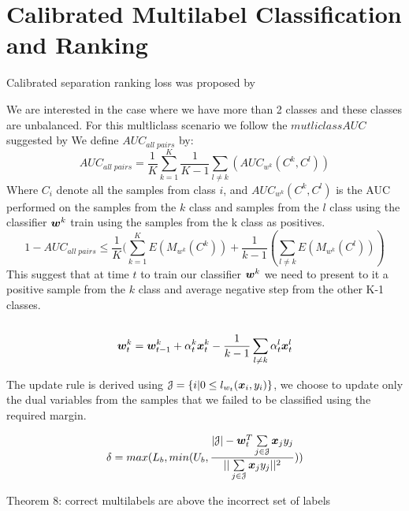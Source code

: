 \section{Calibrated Multilabel Classification and Ranking}

Calibrated separation ranking loss was proposed by \cite{YuhongGuo}

We are interested in the case where we have more than 2 classes and these classes are unbalanced. For this multliclass scenario we follow the $mutliclass AUC$ suggested by \cite{Hand2001}  
We define $AUC_{all \; pairs}$ by:
\[
	AUC_{all \; pairs} = \frac{1}{K} \sum\limits_{k=1}^{K}  \frac{1}{K-1}\sum\limits_{l \neq k} (AUC_{w^k}(C^k, C^l)) 
\]
Where $C_i$ denote all the samples from class $i$, and $AUC_{w^k}(C^k, C^l)$ is the AUC performed on the samples from the $k$ class and samples from the $l$ class using the classifier $ \bm{w}^k $ train using the samples from the k class as positives.
\[
1 - AUC_{all \; pairs} \leq \frac{1}{K} ( \sum\limits_{k=1}^{K} E(M_{w^k}(C^k)) + \frac{1}{k-1} ( \sum\limits_{l \neq k}  E(M_{w^k}(C^l)) )
\]
This suggest that at time $t$ to train our classifier $\bm{w}^k $ we need to present to it a positive sample from the $k$ class and average negative step from the other K-1 classes.\\
\\
\[
  \bm{w}^k_t = \bm{w}^k_{t-1} + \alpha^k_t \bm{x}^k_t - \frac{1}{k-1}\sum\limits_{l \neq k} \alpha^l_t \bm{x}^l_t
\]


The update rule is derived using $\mathcal{J} = \{ i | 0 \leq l_{w_t}(\bm{x}_i, y_i) \}$, we choose to update only the dual variables from the samples that we failed to be classified using the required margin.

\[ \delta = max(L_b   , min(U_b , \frac{|\mathcal{J}| - \bm{w}_t^T \sum\limits_{j \in \mathcal{J}} {\bm{x}_j y_j}   }{|| \sum\limits_{j \in \mathcal{J} }{\bm{x}_j y_j} ||^2 }  ) )
\]

Theorem 8: correct multilabels are above the incorrect set of labels
